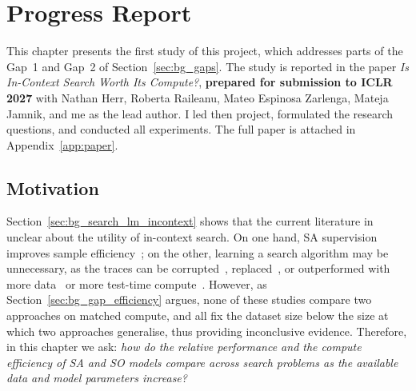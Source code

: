 \chapter{Progress Report}
\label{ch:progress_report}

This chapter presents the first study of this project, which addresses parts of the Gap~1 and Gap~2 of Section~\ref{sec:bg_gaps}.
The study is reported in the paper \emph{Is In-Context Search Worth Its Compute?}, \textbf{prepared for submission to ICLR 2027} with Nathan Herr, Roberta Raileanu, Mateo Espinosa Zarlenga, Mateja Jamnik, and me as the lead author.
I led then project, formulated the research questions, and conducted all experiments.
The full paper is attached in Appendix~\ref{app:paper}.

\section{Motivation}
\label{sec:progress_motivation}

Section~\ref{sec:bg_search_lm_incontext} shows that the current literature in unclear about the utility of in-context search.
On one hand, SA supervision improves sample efficiency~\citep{lehnertBetterPlanningTransformers2024,gandhiStreamSearchSoS2024}; on the other, learning a search algorithm may be unnecessary, as the traces can be corrupted~\citep{suDualformerControllableFast2025}, replaced~\citep{valmeekamSemanticsUnreasonableEffectiveness2025}, or outperformed with more data~\citep{lehnertBetterPlanningTransformers2024} or more test-time compute~\citep{qinBacktrackNotBacktrack2025}.
However, as Section~\ref{sec:bg_gap_efficiency} argues, none of these studies compare two approaches on matched compute, and all fix the dataset size below the size at which two approaches generalise, thus providing inconclusive evidence.
Therefore, in this chapter we ask: \emph{how do the relative performance and the compute efficiency of SA and SO models compare across search problems as the available data and model parameters increase?}

